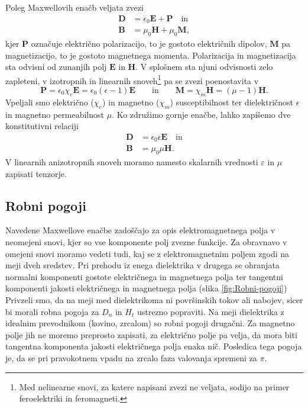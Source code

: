 Poleg Maxwellovih enačb veljata zvezi
\begin{align}
\mathbf{D} & =\epsilon_{0}\mathbf{E}+\mathbf{P} \quad \mathrm{in}\\
\mathbf{B} & =\mu_{0}\mathbf{H}+\mu_{0}\mathbf{M},
\end{align}
kjer $\mathbf{P}$ označuje električno
polarizacijo, to je gostoto električnih dipolov, $\mathbf{M}$
pa magnetizacijo, to je gostoto magnetnega momenta.
Polarizacija in magnetizacija sta odvisni od zunanjih polj $\mathbf{E}$
in $\mathbf{H}$. V splošnem sta njuni odvisnosti zelo zapleteni,
v izotropnih in linearnih snoveh\footnote{Med nelinearne snovi, za katere napisani zvezi ne veljata,
sodijo na primer feroelektriki in feromagneti.}
pa se zvezi poenostavita v 
\begin{equation}
\mathbf{P}=\epsilon_{0}\chi_e\mathbf{E} = \epsilon_{0}(\epsilon-1)\mathbf{E} \qquad \textrm{in} 
\qquad
\mathbf{M}=\chi_m \mathbf{H} = (\mu-1)\mathbf{H}
\label{eq:PM}.
\end{equation}
Vpeljali smo  električno ($\chi_e$) in 
magnetno ($\chi_m$) susceptibilnost ter
dielektričnost $\epsilon$ in
magnetno permeabilnost $\mu$. Ko združimo gornje
enačbe, lahko zapišemo dve konstitutivni
relaciji
\begin{align}
\mathbf{D} & =\epsilon_{0}\epsilon\mathbf{E}\quad \mathrm{in}\\
\mathbf{B} & =\mu_{0}\mu\mathbf{H}.
\end{align}
V linearnih anizotropnih snoveh moramo namesto skalarnih vrednosti $\varepsilon$
in $\mu$ zapisati tenzorje. 

\subsection*{Robni pogoji}
Navedene Maxwellove enačbe zadoščajo za opis elektromagnetnega polja
v neomejeni snovi, kjer so vse komponente polj zvezne funkcije. Za
obravnavo v omejeni snovi moramo vedeti tudi, kaj se z elektromagnetnim
poljem zgodi na meji dveh sredstev. Pri prehodu
iz enega dielektrika v drugega se ohranjata normalni komponenti gostote
električnega in magnetnega polja ter tangentni komponenti jakosti
električnega in magnetnega polja (slika \ref{fig:Robni-pogoji}) 
Privzeli smo, da na meji med dielektrikoma ni površinskih
tokov ali nabojev, sicer bi morali robna pogoja za $D_n$ in $H_t$
ustrezno popraviti. Na meji dielektrika z idealnim prevodnikom (kovino,
zrcalom) so robni pogoji drugačni. Za magnetno polje jih ne moremo
preprosto zapisati, za električno polje pa velja, da mora biti tangentna
komponenta jakosti električnega polja enaka nič. Posledica tega 
pogoja je, da se pri pravokotnem vpadu na zrcalo faza valovanja
spremeni za $\pi$. 

